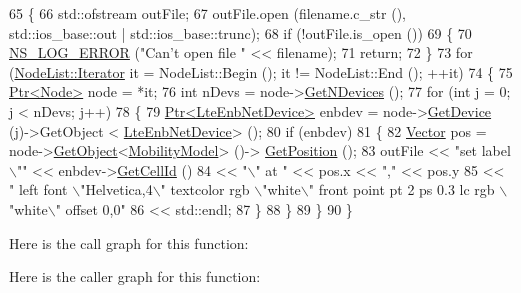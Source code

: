 \begin{DoxyCode}
65 \{
66   std::ofstream outFile;
67   outFile.open (filename.c\_str (), std::ios\_base::out | std::ios\_base::trunc);
68   \textcolor{keywordflow}{if} (!outFile.is\_open ())
69     \{
70       \hyperlink{group__logging_ga0261a8db1d4ac5f79417d117634fd455}{NS\_LOG\_ERROR} (\textcolor{stringliteral}{"Can't open file "} << filename);
71       \textcolor{keywordflow}{return};
72     \}
73   \textcolor{keywordflow}{for} (\hyperlink{classns3_1_1NodeList_a9e2679a94efb4f0066cc21e65440364d}{NodeList::Iterator} it = NodeList::Begin (); it != NodeList::End (); ++it)
74     \{
75       \hyperlink{classns3_1_1Ptr}{Ptr<Node>} node = *it;
76       \textcolor{keywordtype}{int} nDevs = node->\hyperlink{classns3_1_1Node_a531554d2241ba4fa1cd74e3360be6bce}{GetNDevices} ();
77       \textcolor{keywordflow}{for} (\textcolor{keywordtype}{int} j = 0; j < nDevs; j++)
78         \{
79           \hyperlink{classns3_1_1Ptr}{Ptr<LteEnbNetDevice>} enbdev = node->\hyperlink{classns3_1_1Node_a5918dfd24ef632efc9a83a5f6561c76e}{GetDevice} (j)->GetObject <
      \hyperlink{classns3_1_1LteEnbNetDevice}{LteEnbNetDevice}> ();
80           \textcolor{keywordflow}{if} (enbdev)
81             \{
82               \hyperlink{classns3_1_1Vector3D_a7e59b47bc94c9cb1dadff68c1d0112d8}{Vector} pos = node->\hyperlink{classns3_1_1Object_a13e18c00017096c8381eb651d5bd0783}{GetObject}<\hyperlink{classns3_1_1MobilityModel}{MobilityModel}> ()->
      \hyperlink{lena-cqi-threshold_8cc_acebf763e1a0478cec225f9547941ae54}{GetPosition} ();
83               outFile << \textcolor{stringliteral}{"set label \(\backslash\)""} << enbdev->\hyperlink{classns3_1_1LteEnbNetDevice_a6945c929a037e7a582e9e4a849dec337}{GetCellId} ()
84                       << \textcolor{stringliteral}{"\(\backslash\)" at "} << pos.x << \textcolor{stringliteral}{","} << pos.y
85                       << \textcolor{stringliteral}{" left font \(\backslash\)"Helvetica,4\(\backslash\)" textcolor rgb \(\backslash\)"white\(\backslash\)" front  point pt 2 ps 0.3 lc
       rgb \(\backslash\)"white\(\backslash\)" offset 0,0"}
86                       << std::endl;
87             \}
88         \}
89     \}
90 \}
\end{DoxyCode}


Here is the call graph for this function\+:




Here is the caller graph for this function\+:


